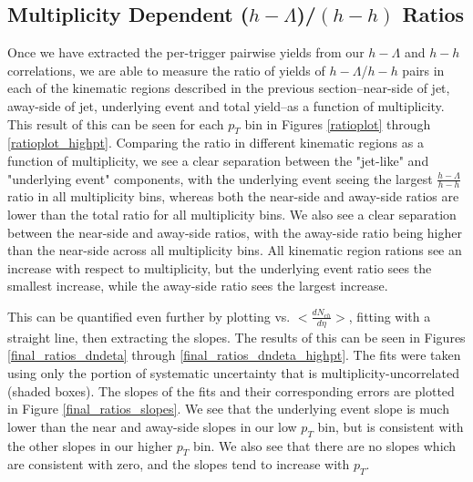 \documentclass[ALICE,manyauthors]{ALICE_analysis_notes}
\begin{document}
\clearpage 


\subsection{Multiplicity Dependent ($h-\Lambda$)/$(h-h)$ Ratios}

Once we have extracted the per-trigger pairwise yields from our $h-\Lambda$ and $h-h$ correlations, we are able to measure the ratio of yields of $h-\Lambda$/$h-h$ pairs in each of the kinematic regions described in the previous section--near-side of jet, away-side of jet, underlying event and total yield--as a function of multiplicity. This result of this can be seen for each $p_{T}$ bin in Figures \ref{ratioplot} through \ref{ratioplot_highpt}. Comparing the ratio in different kinematic regions as a function of multiplicity, we see a clear separation between the "jet-like" and "underlying event" components, with the underlying event seeing the largest $\frac{h-\Lambda}{h-h}$ ratio in all multiplicity bins, whereas both the near-side and away-side ratios are lower than the total ratio for all multiplicity bins. We also see a clear separation between the near-side and away-side ratios, with the away-side ratio being higher than the near-side across all multiplicity bins. All kinematic region rations see an increase with respect to multiplicity, but the underlying event ratio sees the smallest increase, while the away-side ratio sees the largest increase.

This can be quantified even further by plotting vs. $<\frac{dN_{ch}}{d\eta}>$, fitting with a straight line, then extracting the slopes. The results of this can be seen in Figures \ref{final_ratios_dndeta} through \ref{final_ratios_dndeta_highpt}. The fits were taken using only the portion of systematic uncertainty that is multiplicity-uncorrelated (shaded boxes). The slopes of the fits and their corresponding errors are plotted in Figure \ref{final_ratios_slopes}. We see that the underlying event slope is much lower than the near and away-side slopes in our low $p_{T}$ bin, but is consistent with the other slopes in our higher $p_{T}$ bin. We also see that there are no slopes which are consistent with zero, and the slopes tend to increase with $p_{T}$.

\clearpage
\end{document}
